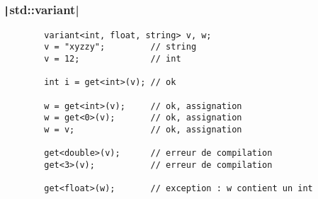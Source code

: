 \documentclass[C++.tex]{subfiles}
\begin{document}
\begin{frame}[fragile]
	\frametitle{\texttt|std::variant|}
	\begin{verbatim}
		variant<int, float, string> v, w;
		v = "xyzzy";         // string
		v = 12;              // int

		int i = get<int>(v); // ok

		w = get<int>(v);     // ok, assignation
		w = get<0>(v);       // ok, assignation
		w = v;               // ok, assignation

		get<double>(v);      // erreur de compilation
		get<3>(v);           // erreur de compilation

		get<float>(w);       // exception : w contient un int
	\end{verbatim}


\end{frame}
\end{document}
